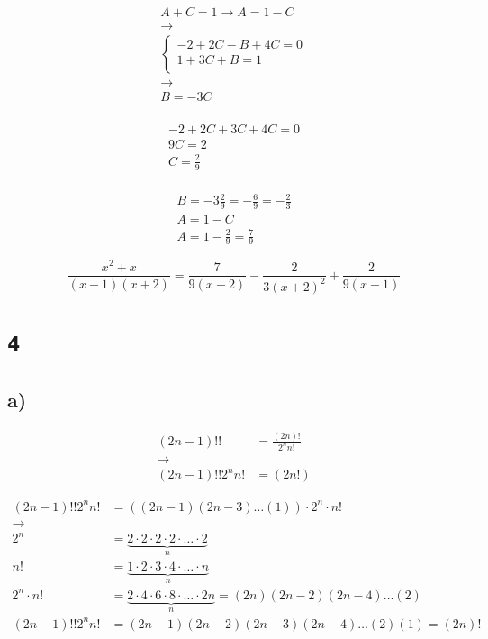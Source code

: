 \documentclass[a4paper,11pt]{report}
\begin{document}
\begin{gather*}
  A + C = 1 \longrightarrow A = 1 - C \\
  \longrightarrow \\
  \begin{cases}
    -2 + 2C - B + 4C = 0 \\
    1 + 3C + B = 1 \\
  \end{cases}\\
  \longrightarrow \\
  B = -3C \\
\end{gather*}

\begin{gather*}
  -2 + 2C + 3C + 4C = 0 \\
  9C = 2 \\
  C = \frac{2}{9}\\
\end{gather*}

\begin{gather*}
  B = -3 \frac{2}{9} = -\frac{6}{9} = - \frac{2}{3}\\
  A = 1 - C \\
  A = 1 - \frac{2}{9} = \frac{7}{9}
\end{gather*}

\[
  \frac{x^2 + x}{(x-1)(x+2)} = \frac{7}{9(x+2)} - \frac{2}{3(x+2)^2} + \frac{2}{9(x-1)}
\]

\section*{\texttt{4}}

\subsection*{a)}

\begin{align*}
  (2n - 1)!! &= \frac{(2n)!}{2^nn!} \\
  \longrightarrow \\
  (2n - 1)!! 2^n n! &= (2n!)
\end{align*}

\begin{align*}
  (2n-1) !! 2^n n! &= \left((2n-1)(2n-3)\dots(1)\right) \cdot 2^n \cdot n! \\
  \longrightarrow \\
  2^n &= \underbrace{2 \cdot 2 \cdot 2 \cdot 2 \cdot \dots \cdot 2}_{n} \\
  n! &= \underbrace{1 \cdot 2 \cdot 3 \cdot 4  \cdot \dots \cdot n}_{n} \\
  2^n \cdot n! &= \underbrace{2 \cdot 4 \cdot 6 \cdot 8 \cdot \dots \cdot 2n}_{n} = (2n)(2n-2)(2n-4)\dots(2) \\
  (2n-1) !! 2^n n! &= (2n-1)(2n-2)(2n-3)(2n-4)\dots(2)(1) = (2n)!
\end{align*}
\end{document}
